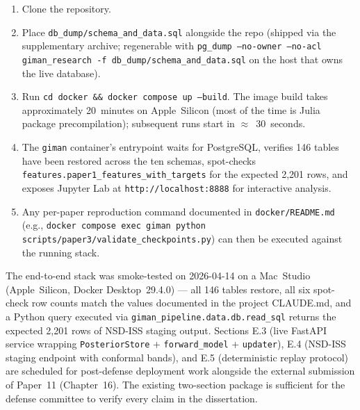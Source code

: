 \begin{enumerate}
  \item Clone the repository.
  \item Place \texttt{db\_dump/schema\_and\_data.sql} alongside the repo (shipped via
    the supplementary archive; regenerable with
    \texttt{pg\_dump --no-owner --no-acl giman\_research -f db\_dump/schema\_and\_data.sql}
    on the host that owns the live database).
  \item Run \texttt{cd docker \&\& docker compose up --build}. The image build takes
    approximately 20~minutes on Apple~Silicon (most of the time is Julia package
    precompilation); subsequent runs start in $\approx$~30~seconds.
  \item The \texttt{giman} container's entrypoint waits for PostgreSQL, verifies
    146 tables have been restored across the ten schemas, spot-checks
    \texttt{features.paper1\_features\_with\_targets} for the expected 2{,}201
    rows, and exposes Jupyter Lab at \texttt{http://localhost:8888} for
    interactive analysis.
  \item Any per-paper reproduction command documented in \texttt{docker/README.md}
    (e.g., \texttt{docker compose exec giman python scripts/paper3/validate\_checkpoints.py})
    can then be executed against the running stack.
\end{enumerate}

The end-to-end stack was smoke-tested on 2026-04-14 on a Mac~Studio
(Apple~Silicon, Docker Desktop~29.4.0) --- all 146 tables restore, all six
spot-check row counts match the values documented in the project CLAUDE.md, and
a Python query executed via
\texttt{giman\_pipeline.data.db.read\_sql} returns the expected 2{,}201 rows of
NSD-ISS staging output. Sections E.3 (live FastAPI service wrapping
\texttt{PosteriorStore} + \texttt{forward\_model} + \texttt{updater}), E.4
(NSD-ISS staging endpoint with conformal bands), and E.5 (deterministic replay
protocol) are scheduled for post-defense deployment work alongside the external
submission of Paper~11 (Chapter~16). The existing two-section package is
sufficient for the defense committee to verify every claim in the dissertation.
